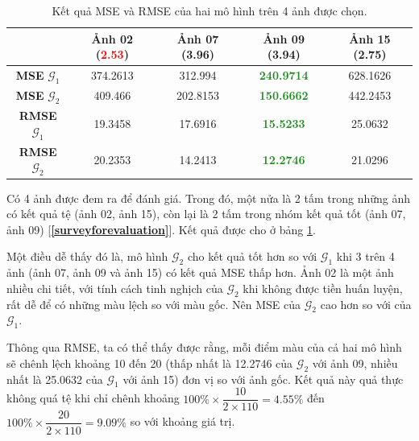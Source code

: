 \documentclass[a4paper, 12pt]{report}
\begin{document}
\begin{table}[!h]
\centering
\begin{tabular}{c|c|c|c|c|}
\cline{2-5}
                                    & \textbf{Ảnh 02 (\textcolor{red}{\textbf{2.53}})}  & \textbf{Ảnh 07 (\textcolor{JungleGreen}{\textbf{3.96}})}  & \textbf{Ảnh 09 (\textcolor{JungleGreen}{\textbf{3.94}})}  & \textbf{Ảnh 15 (\textcolor{Mahogany}{\textbf{2.75}})}  \\ \hline
\multicolumn{1}{|c|}{\textbf{MSE} $\mathcal{G}_1$}  & 374.2613         & 312.994          & \textcolor{ForestGreen}{\textbf{240.9714}}         & 628.1626         \\ \hline
\multicolumn{1}{|c|}{\textbf{MSE} $\mathcal{G}_2$}  & 409.466          & 202.8153         & \textcolor{ForestGreen}{\textbf{150.6662}}         & 442.2453         \\ \hline
\multicolumn{1}{|c|}{\textbf{RMSE} $\mathcal{G}_1$} & 19.3458          & 17.6916          & \textcolor{ForestGreen}{\textbf{15.5233}}          & 25.0632          \\ \hline
\multicolumn{1}{|c|}{\textbf{RMSE} $\mathcal{G}_2$} & 20.2353          & 14.2413          & \textcolor{ForestGreen}{\textbf{12.2746}}          & 21.0296          \\ \hline
\end{tabular}
\caption{Kết quả MSE và RMSE của hai mô hình trên 4 ảnh được chọn.}
\label{tab:msermse}
\end{table}

Có 4 ảnh được đem ra để đánh giá.
Trong đó, một nửa là 2 tấm trong những ảnh có kết quả tệ (ảnh 02, ảnh 15), còn lại là 2 tấm trong nhóm kết quả tốt (ảnh 07, ảnh 09) [\textbf{\ref{surveyforevaluation}}].
Kết quả được cho ở bảng \ref{tab:msermse}.\vspace{5pt}

Một điều dễ thấy đó là, mô hình $\mathcal{G}_2$ cho kết quả tốt hơn so với $\mathcal{G}_1$ khi 3 trên 4 ảnh (ảnh 07, ảnh 09 và ảnh 15) có kết quả MSE thấp hơn.
Ảnh 02 là một ảnh nhiều chi tiết, với tính cách tinh nghịch của $\mathcal{G}_2$ khi không được tiền huấn luyện, rất dễ để có những màu lệch so với màu gốc.
Nên MSE của $\mathcal{G}_2$ cao hơn so với của $\mathcal{G}_1$.\vspace{5pt}

Thông qua RMSE, ta có thể thấy được rằng, mỗi điểm màu của cả hai mô hình sẽ chênh lệch khoảng 10 đến 20 (thấp nhất là 12.2746 của $\mathcal{G}_2$ với ảnh 09, nhiều nhất là 25.0632 của $\mathcal{G}_1$ với ảnh 15) đơn vị so với ảnh gốc.
Kết quả này quả thực không quá tệ khi chỉ chênh khoảng $100\% \times \dfrac{10}{2\times 110} = 4.55 \%$ đến $100\% \times \dfrac{20}{2\times 110} = 9.09 \%$ so với khoảng giá trị.
\end{document}
